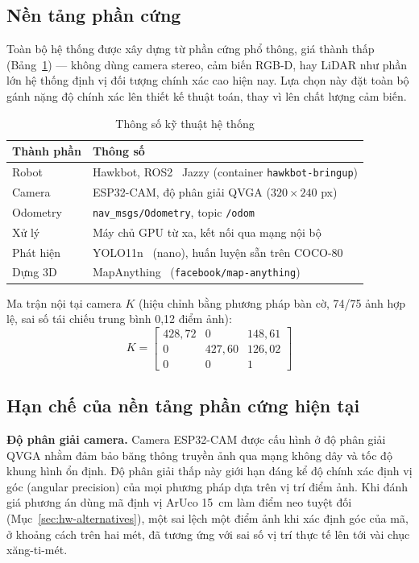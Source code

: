 \documentclass[10pt,a4paper,twocolumn]{article}
\begin{document}
\subsection{Nền tảng phần cứng}

Toàn bộ hệ thống được xây dựng từ phần cứng phổ thông, giá thành thấp (Bảng~\ref{tab:hw-specs}) — không dùng camera stereo, cảm biến RGB-D, hay LiDAR như phần lớn hệ thống định vị đối tượng chính xác cao hiện nay. Lựa chọn này đặt toàn bộ gánh nặng độ chính xác lên thiết kế thuật toán, thay vì lên chất lượng cảm biến.

\begin{table}[H]
\centering
\small
\caption{Thông số kỹ thuật hệ thống}
\label{tab:hw-specs}
\begin{tabular}{@{}p{1.7cm}p{5.8cm}@{}}
\toprule
\textbf{Thành phần} & \textbf{Thông số} \\
\midrule
Robot & Hawkbot, ROS2~\cite{ros} Jazzy (container \texttt{hawkbot-bringup}) \\
Camera & ESP32-CAM, độ phân giải QVGA ($320\times240$ px) \\
Odometry & \texttt{nav\_msgs/Odometry}, topic \texttt{/odom} \\
Xử lý & Máy chủ GPU từ xa, kết nối qua mạng nội bộ \\
Phát hiện & YOLO11n~\cite{yolo,yolo11} (nano), huấn luyện sẵn trên COCO-80 \\
Dựng 3D & MapAnything~\cite{mapanything} (\texttt{facebook/map-anything}) \\
\bottomrule
\end{tabular}
\end{table}

Ma trận nội tại camera $K$ (hiệu chỉnh bằng phương pháp bàn cờ, 74/75 ảnh hợp lệ, sai số tái chiếu trung bình 0,12 điểm ảnh):
\[
K = \begin{bmatrix}
428{,}72 & 0 & 148{,}61 \\
0 & 427{,}60 & 126{,}02 \\
0 & 0 & 1
\end{bmatrix}
\label{tab:intrinsics}
\]

\subsection{Hạn chế của nền tảng phần cứng hiện tại}
\label{sec:hw-limits}

\textbf{Độ phân giải camera.} Camera ESP32-CAM được cấu hình ở độ phân giải QVGA nhằm đảm bảo băng thông truyền ảnh qua mạng không dây và tốc độ khung hình ổn định. Độ phân giải thấp này giới hạn đáng kể độ chính xác định vị góc (angular precision) của mọi phương pháp dựa trên vị trí điểm ảnh. Khi đánh giá phương án dùng mã định vị ArUco \SI{15}{\centi\meter} làm điểm neo tuyệt đối (Mục~\ref{sec:hw-alternatives}), một sai lệch một điểm ảnh khi xác định góc của mã, ở khoảng cách trên hai mét, đã tương ứng với sai số vị trí thực tế lên tới vài chục xăng-ti-mét.
\end{document}
